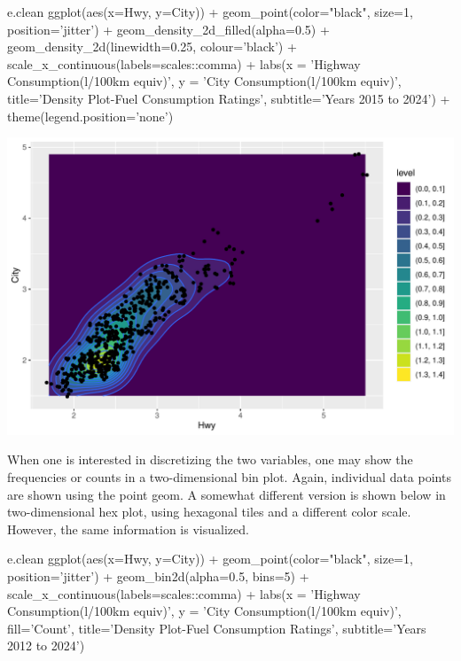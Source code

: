 \begin{samepage}
\begin{Rcode}
e.clean %
  ggplot(aes(x=Hwy, y=City)) + 
    geom_point(color="black", size=1, 
               position='jitter') +
    geom_density_2d_filled(alpha=0.5) + 
    geom_density_2d(linewidth=0.25, colour='black') + 
    scale_x_continuous(labels=scales::comma) +
    labs(x = 'Highway Consumption\n(l/100km equiv)', 
         y = 'City Consumption\n(l/100km equiv)', 
         title='Density Plot-Fuel Consumption Ratings', 
         subtitle='Years 2015 to 2024') +
    theme(legend.position='none')
\end{Rcode}
\end{samepage}

\begin{center}
  \includegraphics[width=.8\textwidth]{fuel.density2d.pdf}
\end{center}

When one is interested in discretizing the two variables, one may show the frequencies or counts in a two-dimensional bin plot. Again, individual data points are shown using the point geom. A somewhat different version is shown below in two-dimensional hex plot, using hexagonal tiles and a different color scale. However, the same information is visualized.

\begin{samepage}
\begin{Rcode}
e.clean %
  ggplot(aes(x=Hwy, y=City)) + 
    geom_point(color="black", size=1, 
               position='jitter') +
    geom_bin2d(alpha=0.5, bins=5) + 
    scale_x_continuous(labels=scales::comma) +
    labs(x = 'Highway Consumption\n(l/100km equiv)', 
         y = 'City Consumption\n(l/100km equiv)', 
         fill='Count', 
         title='Density Plot-Fuel Consumption Ratings', 
         subtitle='Years 2012 to 2024') 
\end{Rcode}
\end{samepage}

